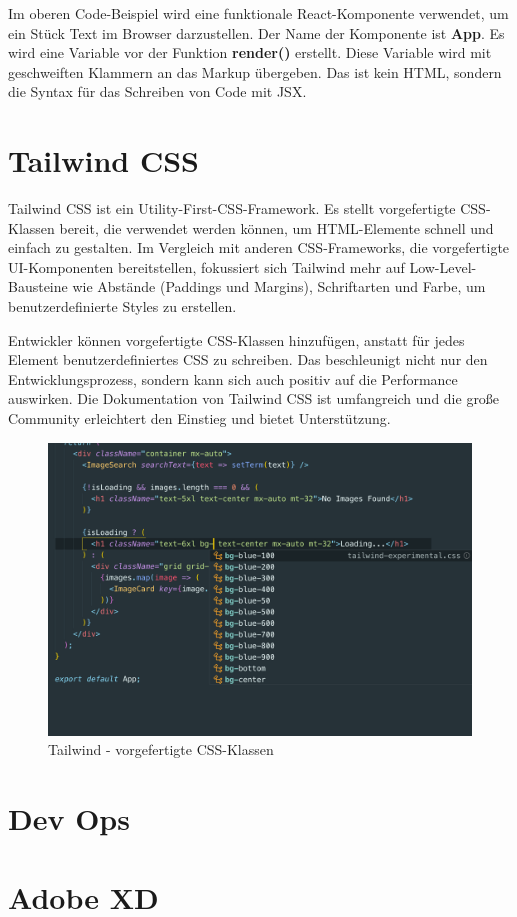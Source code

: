 Im oberen Code-Beispiel wird eine funktionale React-Komponente verwendet, um ein Stück Text im Browser darzustellen. 
Der Name der Komponente ist \textbf{App}. Es wird eine Variable vor der Funktion \textbf{render()} erstellt.
Diese Variable wird mit geschweiften Klammern an das Markup übergeben. Das ist kein HTML, sondern die 
Syntax für das Schreiben von Code mit JSX.

\clearpage

\section{Tailwind CSS}
Tailwind CSS ist ein Utility-First-CSS-Framework. Es stellt vorgefertigte CSS-Klassen bereit, die verwendet 
werden können, um HTML-Elemente schnell und einfach zu gestalten. Im Vergleich mit anderen CSS-Frameworks, 
die vorgefertigte UI-Komponenten bereitstellen, fokussiert sich Tailwind mehr auf Low-Level-Bausteine wie 
Abstände (Paddings und Margins), Schriftarten und Farbe, um benutzerdefinierte Styles zu erstellen.

Entwickler können vorgefertigte CSS-Klassen hinzufügen, anstatt für jedes Element benutzerdefiniertes CSS zu 
schreiben. Das beschleunigt nicht nur den Entwicklungsprozess, sondern kann sich auch positiv auf die Performance 
auswirken. Die Dokumentation von Tailwind CSS ist umfangreich und die große Community erleichtert den Einstieg und 
bietet Unterstützung.

\begin{figure}[ht!]
    \includegraphics[width=.94\textwidth]{pics/tailwindCSS-class-showcase.png}
    \caption{\label{fig:The-caption}Tailwind - vorgefertigte CSS-Klassen \cite{APCW2006}}
  \end{figure}

\section{Dev Ops}

\section{Adobe XD}


